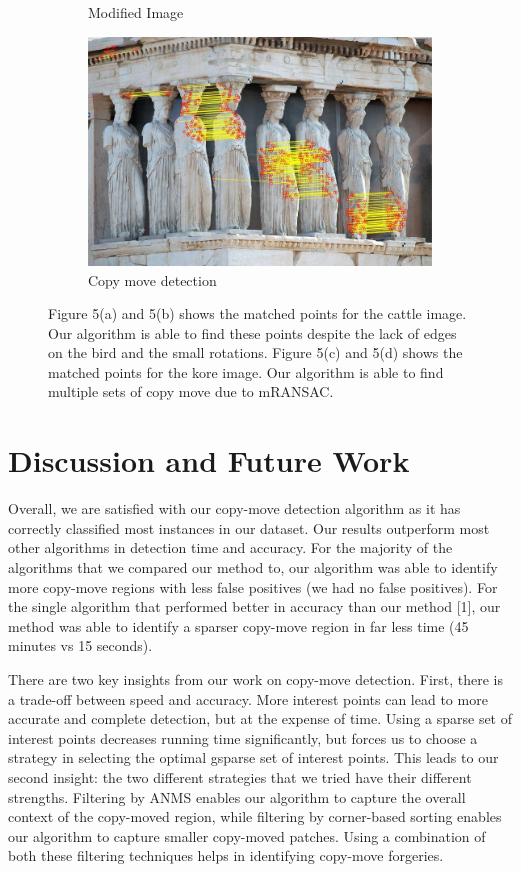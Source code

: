 \documentclass[12pt]{article}
\begin{document}
\begin{figure}
\begin{subfigure}{.5\textwidth}
  \caption{Modified Image}
  \label{fig:sub1}
\end{subfigure}%
\begin{subfigure}{.5\textwidth}
  \centering
  \includegraphics[width=.8\linewidth]{./gfx/kore_mod.jpg}
  \caption{Copy move detection}
  \label{fig:sub2}
\end{subfigure}
\caption{Figure 5(a) and 5(b) shows the matched points for the cattle image. Our algorithm is able to find these points despite the lack of edges on the bird and the small rotations. Figure 5(c) and 5(d) shows the matched points for the kore image. Our algorithm is able to find multiple sets of copy move due to mRANSAC.}
\label{fig:test}
\end{figure}

\section*{Discussion and Future Work}
Overall, we are satisfied with our copy-move detection algorithm as it has correctly classified most instances in our dataset. Our results outperform most other algorithms in detection time and accuracy. For the majority of the algorithms that we compared our method to, our algorithm was able to identify more copy-move regions with less false positives (we had no false positives). For the single algorithm that performed better in accuracy than our method [1], our method was able to identify a sparser copy-move region in far less time (45 minutes vs 15 seconds).

There are two key insights from our work on copy-move detection. First, there is a trade-off between speed and accuracy. More interest points can lead to more accurate and complete detection, but at the expense of time. Using a sparse set of interest points decreases running time significantly, but forces us to choose a strategy in selecting the optimal gsparse set of interest points. This leads to our second insight: the two different strategies that we tried have their different strengths. Filtering by ANMS enables our algorithm to capture the overall context of the copy-moved region, while filtering by corner-based sorting enables our algorithm to capture smaller copy-moved patches. Using a combination of both these filtering techniques helps in identifying copy-move forgeries.
\end{document}
